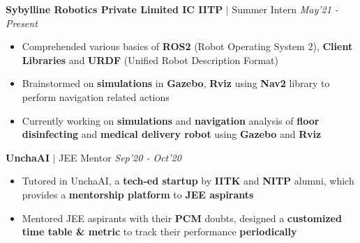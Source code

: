 \documentclass[9pt]{extarticle}
\begin{document}
\hspace{-1.5mm}\textbf{Sybylline Robotics Private Limited IC IITP} $|$ Summer Intern
\hfill\hfill\textit{May'21 - Present}
\begin{itemize}
\item Comprehended various basics of \textbf{ROS2} (Robot Operating System 2), \textbf{Client Libraries}  and \textbf{URDF} (Unified Robot Description Format)
\item Brainstormed on \textbf{simulations} in \textbf{Gazebo}, \textbf{Rviz} using \textbf{Nav2} library to perform navigation related actions 
\item Currently working on \textbf{simulations} and \textbf{navigation} analysis of \textbf{floor disinfecting} and \textbf{medical delivery robot} using \textbf{Gazebo} and \textbf{Rviz} 
\end{itemize}

\vspace{2.5mm}

\hspace{-1.5mm}\textbf{UnchaAI} $|$ JEE Mentor
\hfill\hfill\textit{Sep'20 - Oct'20}
\begin{itemize}
\item Tutored in UnchaAI, a \textbf{tech-ed startup} by \textbf{IITK} and \textbf{NITP} alumni, which provides a \textbf{mentorship platform} to \textbf{JEE aspirants}
\item  Mentored JEE aspirants with their \textbf{PCM} doubts, designed a \textbf{customized time table \& metric} to track their performance \textbf{periodically}
\end{itemize}
\vspace{-1mm}
\end{document}
